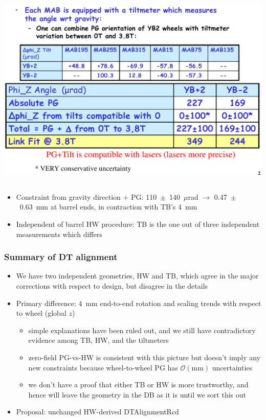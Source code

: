 \documentclass[compress]{beamer}
\begin{document}
\begin{frame}
\begin{columns}
\includegraphics[width=\linewidth]{inclinometers.png}
\end{columns}

\vfill
\begin{itemize}
\item Constraint from gravity direction $+$ PG: \mbox{110 $\pm$ 140~$\mu$rad} $\to$ \mbox{0.47 $\pm$ 0.63~mm} at barrel ends, in contraction with TB's 4~mm
\item Independent of barrel HW procedure: TB is the one out of three independent measurements which differs
\end{itemize}
\end{frame}

\begin{frame}
\frametitle{Summary of DT alignment}
\begin{itemize}
\item We have two independent geometries, HW and TB, which agree in
  the major corrections with respect to design, but disagree in the details
\item Primary difference: 4~mm end-to-end rotation and scaling trends with respect to wheel (global $z$)
\begin{itemize}\setlength{\itemsep}{0.2 cm}
\item simple explanations have been ruled out, and we still have contradictory evidence among TB, HW, and the tiltmeters
\item zero-field PG-vs-HW is consistent with this picture but doesn't imply any new constraints because wheel-to-wheel PG has $\mathcal{O}(\mbox{mm})$ uncertainties
\item we don't have a proof that either TB or HW is more trustworthy, and hence will leave the geometry in the DB as it is until we sort this out
\end{itemize}
\item Proposal: unchanged HW-derived DTAlignmentRcd
\end{itemize}
\end{frame}
\end{document}
